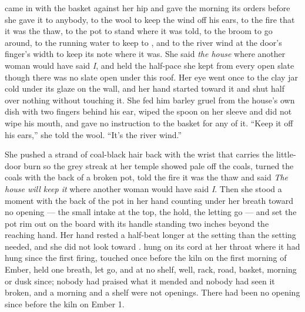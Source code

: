  came in with the basket against her hip and gave the morning its orders before she gave it to anybody, to the wool to keep the wind off his ears, to the fire that it was the thaw, to the pot to stand where it was told, to the broom to go around, to the running water to keep to , and to the river wind at the door's finger's width to keep its note where it was. She said \emph{the house} where another woman would have said \emph{I}, and held the half-pace she kept from every open slate though there was no slate open under this roof. Her eye went once to the clay jar cold under its glaze on the wall, and her hand started toward it and shut half over nothing without touching it. She fed him barley gruel from the house's own dish with two fingers behind his ear, wiped the spoon on her sleeve and did not wipe his mouth, and gave no instruction to the basket for any of it. “Keep it off his ears,” she told the wool. “It's the river wind.”

She pushed a strand of coal-black hair back with the wrist that carries the little-door burn so the grey streak at her temple showed pale off the coals, turned the coals with the back of a broken pot, told the fire it was the thaw and said \emph{The house will keep it} where another woman would have said \emph{I}. Then she stood a moment with the back of the pot in her hand counting under her breath toward no opening --- the small intake at the top, the hold, the letting go --- and set the pot rim out on the board with its handle standing two inches beyond the reaching hand. Her hand rested a half-beat longer at the setting than the setting needed, and she did not look toward .  hung on its cord at her throat where it had hung since the first firing, touched once before the kiln on the first morning of Ember, held one breath, let go, and at no shelf, well, rack, road, basket, morning or dusk since; nobody had praised what it mended and nobody had seen it broken, and a morning and a shelf were not openings. There had been no opening since before the kiln on Ember 1.

\scenebreak

